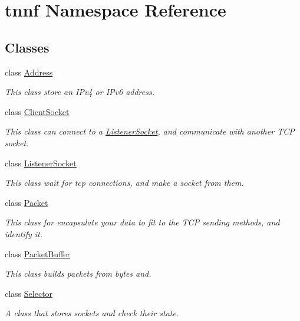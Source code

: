 \hypertarget{namespacetnnf}{}\section{tnnf Namespace Reference}
\label{namespacetnnf}
\subsection*{Classes}
\begin{DoxyCompactItemize}
\item 
class \hyperlink{classtnnf_1_1_address}{Address}
\begin{DoxyCompactList}\small\item\em This class store an I\+Pv4 or I\+Pv6 address. \end{DoxyCompactList}\item 
class \hyperlink{classtnnf_1_1_client_socket}{Client\+Socket}
\begin{DoxyCompactList}\small\item\em This class can connect to a \hyperlink{classtnnf_1_1_listener_socket}{Listener\+Socket}, and communicate with another T\+C\+P socket. \end{DoxyCompactList}\item 
class \hyperlink{classtnnf_1_1_listener_socket}{Listener\+Socket}
\begin{DoxyCompactList}\small\item\em This class wait for tcp connections, and make a socket from them. \end{DoxyCompactList}\item 
class \hyperlink{classtnnf_1_1_packet}{Packet}
\begin{DoxyCompactList}\small\item\em This class for encapsulate your data to fit to the T\+C\+P sending methods, and identify it. \end{DoxyCompactList}\item 
class \hyperlink{classtnnf_1_1_packet_buffer}{Packet\+Buffer}
\begin{DoxyCompactList}\small\item\em This class builds packets from bytes and. \end{DoxyCompactList}\item 
class \hyperlink{classtnnf_1_1_selector}{Selector}
\begin{DoxyCompactList}\small\item\em A class that stores sockets and check their state. \end{DoxyCompactList}\item 

\end{DoxyCompactItemize}
